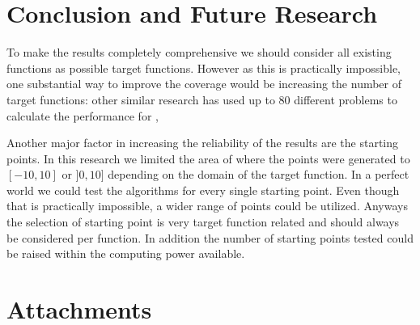 \documentclass[a4paper,english,titlepage,12pt]{article}
\begin{document}
\section{Conclusion and Future Research}


To make the results completely comprehensive we should consider all existing functions as possible target functions. However as this is practically impossible, one substantial way to improve the coverage would be increasing the number of target functions: other similar research has used up to 80 different problems to calculate the performance for \cite{monotone_line_search_performance},

Another major factor in increasing the reliability of the results are the starting points. In this research we limited the area of where the points were generated to $[-10, 10]$ or $]0, 10]$ depending on the domain of the target function. In a perfect world we could test the algorithms for every single starting point. Even though that is practically impossible, a wider range of points could be utilized. Anyways the selection of starting point is very target function related and should always be considered per function. In addition the number of starting points tested could be raised within the computing power available.


\newpage
% 






\newpage
\section{Attachments}

\end{document}
